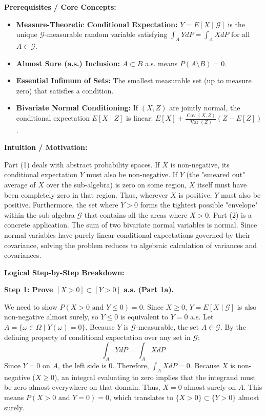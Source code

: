 \begin{solution}
\textbf{Prerequisites / Core Concepts:}
\begin{itemize}
    \item \textbf{Measure-Theoretic Conditional Expectation:} $Y = E[X \mid \mathcal{G}]$ is the unique $\mathcal{G}$-measurable random variable satisfying $\int_A Y dP = \int_A X dP$ for all $A \in \mathcal{G}$.
    \item \textbf{Almost Sure (a.s.) Inclusion:} $A \subset B$ a.s. means $P(A \setminus B) = 0$.
    \item \textbf{Essential Infimum of Sets:} The smallest measurable set (up to measure zero) that satisfies a condition.
    \item \textbf{Bivariate Normal Conditioning:} If $(X, Z)$ are jointly normal, the conditional expectation $E[X \mid Z]$ is linear: $E[X] + \frac{\operatorname{Cov}(X,Z)}{\operatorname{Var}(Z)}(Z - E[Z])$.
\end{itemize}

\textbf{Intuition / Motivation:}

Part (1) deals with abstract probability spaces. If $X$ is non-negative, its conditional expectation $Y$ must also be non-negative. If $Y$ (the "smeared out" average of $X$ over the sub-algebra) is zero on some region, $X$ itself must have been completely zero in that region. Thus, wherever $X$ is positive, $Y$ must also be positive. Furthermore, the set where $Y > 0$ forms the tightest possible "envelope" within the sub-algebra $\mathcal{G}$ that contains all the areas where $X > 0$.
Part (2) is a concrete application. The sum of two bivariate normal variables is normal. Since normal variables have purely linear conditional expectations governed by their covariance, solving the problem reduces to algebraic calculation of variances and covariances.

\textbf{Logical Step-by-Step Breakdown:}

\textbf{Step 1: Prove $[X > 0] \subset [Y > 0]$ a.s. (Part 1a).}

We need to show $P(X > 0 \text{ and } Y \leq 0) = 0$. Since $X \geq 0$, $Y = E[X \mid \mathcal{G}]$ is also non-negative almost surely, so $Y \leq 0$ is equivalent to $Y = 0$ a.s.
Let $A = \{ \omega \in \Omega \mid Y(\omega) = 0 \}$. Because $Y$ is $\mathcal{G}$-measurable, the set $A \in \mathcal{G}$.
By the defining property of conditional expectation over any set in $\mathcal{G}$:
\[ \int_A Y dP = \int_A X dP \]
Since $Y = 0$ on $A$, the left side is $0$. Therefore, $\int_A X dP = 0$.
Because $X$ is non-negative ($X \geq 0$), an integral evaluating to zero implies that the integrand must be zero almost everywhere on that domain.
Thus, $X = 0$ almost surely on $A$.
This means $P(X > 0 \text{ and } Y = 0) = 0$, which translates to $\{X > 0\} \subset \{Y > 0\}$ almost surely.


\end{solution}
